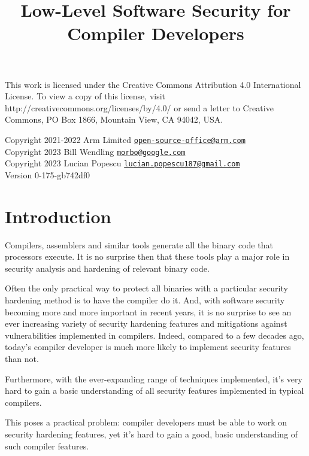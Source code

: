 \documentclass[
  a4paper,
]{report}
\title{Low-Level Software Security for Compiler Developers}
\author{}
\date{}
\begin{document}
\maketitle

\clearpage

\vspace*{\fill}
This work is licensed under the Creative Commons Attribution 4.0 International
License. To view a copy of this license, visit
http://creativecommons.org/licenses/by/4.0/ or send a letter to Creative
Commons, PO Box 1866, Mountain View, CA 94042, USA.

  Copyright 2021-2022 Arm Limited
\href{mailto:open-source-office@arm.com}{\nolinkurl{open-source-office@arm.com}}\\
  Copyright 2023 Bill Wendling
\href{mailto:morbo@google.com}{\nolinkurl{morbo@google.com}}\\
  Copyright 2023 Lucian Popescu
\href{mailto:lucian.popescu187@gmail.com}{\nolinkurl{lucian.popescu187@gmail.com}}\\

Version 0-175-gb742df0
\clearpage

{
\hypersetup{linkcolor=}
\setcounter{tocdepth}{2}
\tableofcontents
}
\hypertarget{introduction}{%
\chapter{Introduction}\label{introduction}}

Compilers, assemblers and similar tools generate all the binary code
that processors execute. It is no surprise then that these tools play a
major role in security analysis and hardening of relevant binary code.

Often the only practical way to protect all binaries with a particular
security hardening method is to have the compiler do it. And, with
software security becoming more and more important in recent years, it
is no surprise to see an ever increasing variety of security hardening
features and mitigations against vulnerabilities implemented in
compilers. Indeed, compared to a few decades ago, today's compiler
developer is much more likely to implement security features than not.

Furthermore, with the ever-expanding range of techniques implemented,
it's very hard to gain a basic understanding of all security features
implemented in typical compilers.

This poses a practical problem: compiler developers must be able to work
on security hardening features, yet it's hard to gain a good, basic
understanding of such compiler features.
\end{document}
